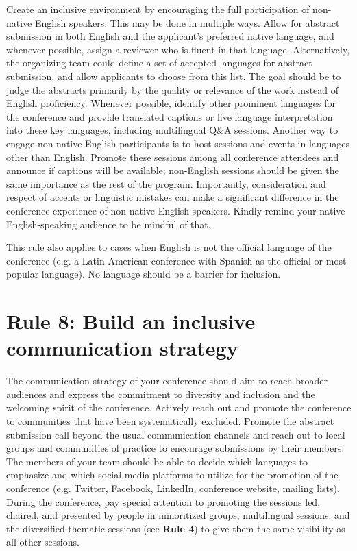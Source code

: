 \documentclass[10pt,letterpaper]{article}
\begin{document}
Create an inclusive environment by encouraging the full participation of non-native English speakers. This may be done in multiple ways.
Allow for abstract submission in both English and the applicant's preferred native language, and whenever possible, assign a reviewer who is fluent in that language. 
Alternatively, the organizing team could define a set of accepted languages for abstract submission, and allow applicants to choose from this list. 
The goal should be to judge the abstracts primarily by the quality or relevance of the work instead of English proficiency.
Whenever possible, identify other prominent languages for the conference and provide translated captions or live language interpretation into these key languages, including multilingual Q\&A sessions.
Another way to engage non-native English participants is to host sessions and events in languages other than English. 
Promote these sessions among all conference attendees and announce if captions will be available; non-English sessions should be given the same importance as the rest of the program.
Importantly, consideration and respect of accents or linguistic mistakes can make a significant difference in the conference experience of non-native English speakers. Kindly remind your native English-speaking audience to be mindful of that.

This rule also applies to cases when English is not the official language of the conference (e.g. a Latin American conference with Spanish as the official or most popular language). No language should be a barrier for inclusion. 



\section*{Rule 8: Build an inclusive communication strategy}
\label{rule_communication}

The communication strategy of your conference should aim to reach broader audiences and express the commitment to diversity and inclusion and the welcoming spirit of the conference.
Actively reach out and promote the conference to communities that have been systematically excluded. 
Promote the abstract submission call beyond the usual communication channels and reach out to local groups and communities of practice to encourage submissions by their members.
The members of your team should be able to decide which languages to emphasize and which social media platforms to utilize for the promotion of the conference (e.g. Twitter, Facebook, LinkedIn, conference website, mailing lists).
During the conference, pay special attention to promoting the sessions led, chaired, and presented by people in minoritized groups, multilingual sessions, and the diversified thematic sessions (see \textbf{Rule 4}) to give them the same visibility as all other sessions.
\end{document}
